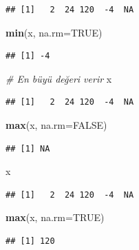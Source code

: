 \documentclass[
]{book}
\newenvironment{Shaded}{\begin{snugshade}}{\end{snugshade}}
\newcommand{\AttributeTok}[1]{\textcolor[rgb]{0.13,0.29,0.53}{#1}}
\newcommand{\CommentTok}[1]{\textcolor[rgb]{0.56,0.35,0.01}{\textit{#1}}}
\newcommand{\ConstantTok}[1]{\textcolor[rgb]{0.56,0.35,0.01}{#1}}
\newcommand{\FunctionTok}[1]{\textcolor[rgb]{0.13,0.29,0.53}{\textbf{#1}}}
\newcommand{\NormalTok}[1]{#1}
\begin{document}
\begin{verbatim}
## [1]   2  24 120  -4  NA
\end{verbatim}

\begin{Shaded}
\begin{Highlighting}[]
\FunctionTok{min}\NormalTok{(x, }\AttributeTok{na.rm=}\ConstantTok{TRUE}\NormalTok{)}
\end{Highlighting}
\end{Shaded}

\begin{verbatim}
## [1] -4
\end{verbatim}

\begin{Shaded}
\begin{Highlighting}[]
\CommentTok{\# En büyü değeri verir}
\NormalTok{x}
\end{Highlighting}
\end{Shaded}

\begin{verbatim}
## [1]   2  24 120  -4  NA
\end{verbatim}

\begin{Shaded}
\begin{Highlighting}[]
\FunctionTok{max}\NormalTok{(x, }\AttributeTok{na.rm=}\ConstantTok{FALSE}\NormalTok{)}
\end{Highlighting}
\end{Shaded}

\begin{verbatim}
## [1] NA
\end{verbatim}

\begin{Shaded}
\begin{Highlighting}[]
\NormalTok{x}
\end{Highlighting}
\end{Shaded}

\begin{verbatim}
## [1]   2  24 120  -4  NA
\end{verbatim}

\begin{Shaded}
\begin{Highlighting}[]
\FunctionTok{max}\NormalTok{(x, }\AttributeTok{na.rm=}\ConstantTok{TRUE}\NormalTok{)}
\end{Highlighting}
\end{Shaded}

\begin{verbatim}
## [1] 120
\end{verbatim}
\end{document}
